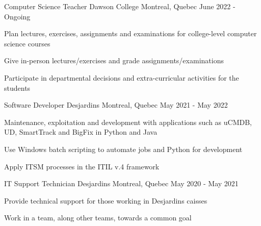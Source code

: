 

\begin{cventries}

  
  \cventry
    {Computer Science Teacher} %
    {Dawson College} %
    {Montreal, Quebec} %
    {June 2022 - Ongoing} %
    {
      \begin{cvitems} %
        \item {Plan lectures, exercises, assignments and examinations for college-level computer science courses}
        \item {Give in-person lectures/exercises and grade assignments/examinations}
        \item {Participate in departmental decisions and extra-curricular activities for the students}
      \end{cvitems}
    }
  
  \cventry
    {Software Developer} %
    {Desjardins} %
    {Montreal, Quebec} %
    {May 2021 - May 2022} %
    {
      \begin{cvitems} %
        \item {Maintenance, exploitation and development with applications such as uCMDB, UD, SmartTrack and BigFix in Python and Java}
        \item {Use Windows batch scripting to automate jobs and Python for development}
        \item {Apply ITSM processes in the ITIL v.4 framework}
      \end{cvitems}
    }
    
  \cventry
    {IT Support Technician} %
    {Desjardins} %
    {Montreal, Quebec} %
    {May 2020 - May 2021} %
    {
      \begin{cvitems} %
        \item {Provide technical support for those working in Desjardins caisses}
        \item {Work in a team, along other teams, towards a common goal}
      \end{cvitems}
    }
    

\end{cventries}
